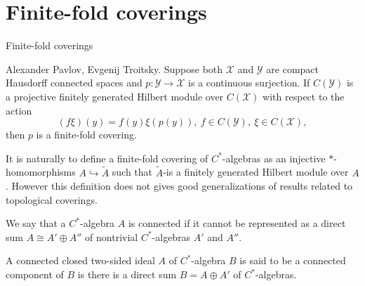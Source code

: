 \documentclass{beamer}
\theoremstyle{plain}
\newcommand{\hookto}{\hookrightarrow}        %
\begin{document}
\section{Finite-fold coverings}
\begin{frame}
	\begin{center}
	\huge{Finite-fold coverings}
	\end{center}
	\begin{theorem} 	\alert{Alexander Pavlov, Evgenij Troitsky}.
		Suppose both $\mathcal X$ and $\mathcal Y$ are compact Hausdorff connected spaces and $p :\mathcal  Y \to \mathcal X$
		is a continuous surjection. If $C(\mathcal Y )$ is a projective finitely generated Hilbert module over
		$C(\mathcal X)$ with respect to the action
		\begin{equation*}
			(f\xi)(y) = f(y)\xi(p(y)), ~ f \in  C(\mathcal Y ), ~ \xi \in  C(\mathcal X),
		\end{equation*}
		then $p$ is a finite-fold  covering.
	\end{theorem}
	It is naturally to define a finite-fold covering of $C^*$-algebras as an injective $*$-homomorphisms $A\hookto \widetilde A$ such that $ \widetilde A$-is a finitely generated Hilbert module over
	$A$. However this definition does not gives good generalizations of results  related to topological coverings.
	
\end{frame}
\begin{frame}
  \begin{definition}\label{connected_c_a_defn}
	We say that a $C^*$-algebra $A$ is \alert{connected} if it cannot be represented as a direct sum  $A \cong A' \oplus A''$ of nontrivial $C^*$-algebras $A'$ and $A''$.
	
\end{definition}
\begin{definition}\label{connected_comp_defn}
	A connected closed two-sided ideal $A$ of  $C^*$-algebra $B$ is said to be a \alert{connected component of}  $B$ is there is a direct sum $B = A \oplus A'$ of $C^*$-algebras.
	\end{definition}
\end{frame}
\end{document}
